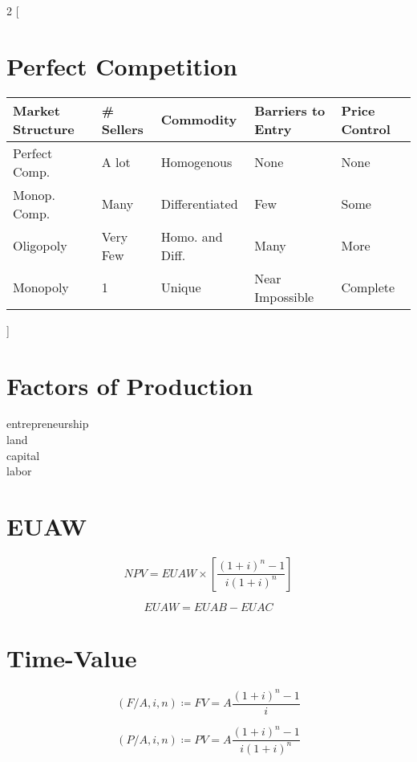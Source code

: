 \documentclass[10pt]{article}
\begin{document}
\begin{multicols*}{2}
  [
\section{Perfect Competition}
  \begin{tabular}{|l| l l l l|}
    \hline
    Market Structure & \# Sellers & Commodity & Barriers to Entry & Price Control\\
    \hline
    Perfect Comp. & A lot & Homogenous & None & None\\
    Monop. Comp. & Many & Differentiated & Few & Some\\
    Oligopoly & Very Few & Homo. and Diff. & Many & More\\
    Monopoly & 1 & Unique & Near Impossible & Complete\\
    \hline
  \end{tabular}
]

  \section{Factors of Production}
    entrepreneurship\\
    land\\
    capital\\
    labor\\

\section{EUAW}
\begin{equation*}
  NPV = EUAW \times \left[ \frac{{(1 + i)}^n - 1}{i{(1+i)}^n} \right]
\end{equation*}

\begin{equation*}
  EUAW = EUAB - EUAC
\end{equation*}

\section{Time-Value}
\begin{equation*}
  (F/A, i, n) \coloneqq FV = A\frac{{(1+i)}^n - 1}{i}
\end{equation*}

\begin{equation*}
  (P/A, i, n) \coloneqq PV = A\frac{{(1+i)}^n - 1}{i{(1+i)}^n}
\end{equation*}


\end{multicols*}
\end{document}
